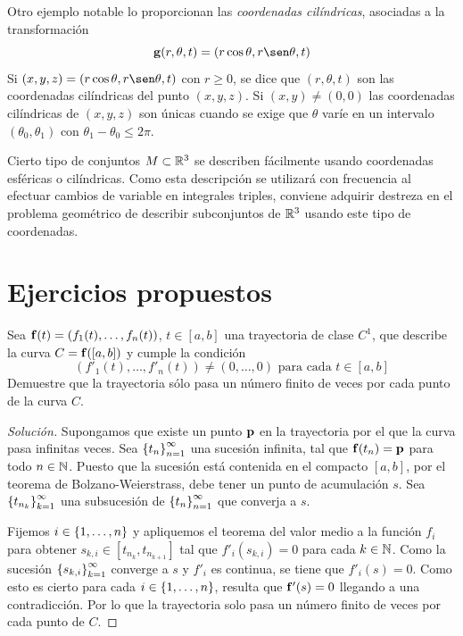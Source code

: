 Otro ejemplo notable lo proporcionan las {\it coordenadas cilíndricas}, asociadas a la transformación
$$\g(r,\theta, t)=(r\cos\theta,r\sen\theta,t)$$
Si $(x,y,z)=(r\cos\theta,r\sen\theta,t)$ con $r\geq 0$, se dice que $(r,\theta,t)$ son las coordenadas cilíndricas del punto $(x,y,z)$. Si $(x,y)\neq (0,0)$ las coordenadas cilíndricas de $(x,y,z)$ son únicas cuando se exige que $\theta$ varíe en un intervalo $(\theta_0,\theta_1)$ con $\theta_1-\theta_0\leq 2\pi$.

Cierto tipo de conjuntos $M\subset\mathbb{R}^3$ se describen fácilmente usando coordenadas esféricas o cilíndricas. Como esta descripción se utilizará con frecuencia al efectuar cambios de variable en integrales triples, conviene adquirir destreza en el problema geométrico de describir subconjuntos de $\mathbb{R}^3$ usando este tipo de coordenadas.

\section{Ejercicios propuestos}

\begin{ejer}
    Sea $\mathbf{f}(t)=(f_1(t),\dots,f_n(t))$, $t\in [a,b]$ una trayectoria de clase $C^1$, que describe la curva $C=\mathbf{f}([a,b])$ y cumple la condición
    $$(f'_1(t),\dots,f'_n(t))\neq (0,\dots,0)\text{ para cada }t\in [a,b]$$
    Demuestre que la trayectoria sólo pasa un número finito de veces por cada punto de la curva $C$.
\end{ejer}

\begin{reader}
    \begin{proof}[Solución] Supongamos que existe un punto $\mathbf{p}$ en la trayectoria por el que la curva pasa infinitas veces. Sea $\left\lbrace t_n\right\rbrace_{n=1}^\infty$ una sucesión infinita, tal que $\mathbf{f}(t_n)=\mathbf{p}$ para todo $n\in\mathbb{N}$. Puesto que la sucesión está contenida en el compacto $[a,b]$, por el teorema de Bolzano-Weierstrass, debe tener un punto de acumulación $s$. Sea $\left\lbrace t_{n_k}\right\rbrace_{k=1}^\infty$ una subsucesión de $\left\lbrace t_n\right\rbrace_{n=1}^\infty$ que converja a $s$. 
    
    Fijemos $i\in\left\lbrace1,\dots,n\right\rbrace$ y apliquemos el teorema del valor medio a la función $f_i$ para obtener $s_{k,i} \in[t_{n_k},t_{n_{k+1}}]$ tal que $f'_i(s_{k,i})=0$ para cada $k\in\mathbb{N}$. Como la sucesión $\left\lbrace s_{k,i}\right\rbrace_{k=1}^\infty$ converge a $s$ y $f'_i$ es continua, se tiene que $f'_i(s)=0$. Como esto es cierto para cada $i\in\left\lbrace1,\dots,n\right\rbrace$, resulta que $\mathbf{f}'(s)=0$ llegando a una contradicción. Por lo que la trayectoria solo pasa un número finito de veces por cada punto de $C$.
    \end{proof}
\end{reader}